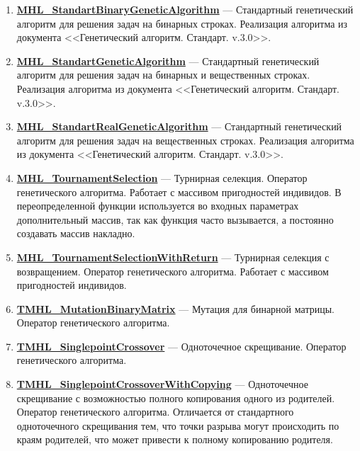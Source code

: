 \documentclass[a4paper,12pt]{article}
\begin{document}
\begin{enumerate}
\item \textbf{\hyperref[MHL_StandartBinaryGeneticAlgorithm]{MHL\_StandartBinaryGeneticAlgorithm}} --- Стандартный генетический алгоритм для решения задач на бинарных строках. Реализация алгоритма из документа <<Генетический алгоритм. Стандарт. v.3.0>>.

\item \textbf{\hyperref[MHL_StandartGeneticAlgorithm]{MHL\_StandartGeneticAlgorithm}} --- Стандартный генетический алгоритм для решения задач на бинарных и вещественных строках. Реализация алгоритма из документа <<Генетический алгоритм. Стандарт. v.3.0>>.

\item \textbf{\hyperref[MHL_StandartRealGeneticAlgorithm]{MHL\_StandartRealGeneticAlgorithm}} --- Стандартный генетический алгоритм для решения задач на вещественных строках. Реализация алгоритма из документа <<Генетический алгоритм. Стандарт. v.3.0>>.

\item \textbf{\hyperref[MHL_TournamentSelection]{MHL\_TournamentSelection}} --- Турнирная селекция. Оператор генетического алгоритма. Работает с массивом пригодностей индивидов. В переопределенной функции используется во входных параметрах дополнительный массив, так как функция часто вызывается, а постоянно создавать массив накладно.

\item \textbf{\hyperref[MHL_TournamentSelectionWithReturn]{MHL\_TournamentSelectionWithReturn}} --- Турнирная селекция с возвращением. Оператор генетического алгоритма. Работает с массивом пригодностей индивидов.

\item \textbf{\hyperref[TMHL_MutationBinaryMatrix]{TMHL\_MutationBinaryMatrix}} --- Мутация для бинарной матрицы. Оператор генетического алгоритма.

\item \textbf{\hyperref[TMHL_SinglepointCrossover]{TMHL\_SinglepointCrossover}} --- Одноточечное скрещивание. Оператор генетического алгоритма.

\item \textbf{\hyperref[TMHL_SinglepointCrossoverWithCopying]{TMHL\_SinglepointCrossoverWithCopying}} --- Одноточечное скрещивание с возможностью полного копирования одного из родителей. Оператор генетического алгоритма. Отличается от стандартного одноточечного скрещивания тем, что точки разрыва могут происходить по краям родителей, что может привести к полному копированию родителя.


\end{enumerate}
\end{document}
